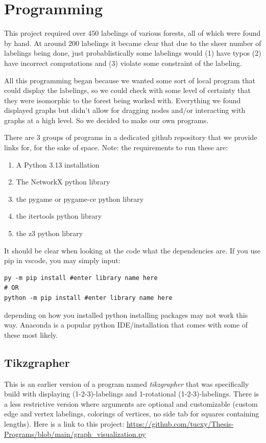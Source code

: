 \chapter{Programming}\label{chap:programming}
This project required over $450$ labelings of various forests, all of which were found by hand. At around $200$ labelings it became clear that due to the sheer number of labelings being done, just probablistically some labelings would (1) have typos (2) have incorrect computations and (3) violate some constraint of the labeling.

All this programming began because we wanted some sort of local program that could display the labelings, so we could check with some level of certainty that they were isomorphic to the forest being worked with. Everything we found displayed graphs but didn't allow for dragging nodes and/or interacting with graphs at a high level. So we decided to make our own programs.

There are $3$ groups of programs in a dedicated github repository that we provide links for, for the sake of space. Note: the requirements to run these are:

\begin{enumerate}
  \item A Python 3.13 installation
  \item The NetworkX python library
  \item the pygame or pygame-ce python library
  \item the itertools python library
  \item the z3 python library
\end{enumerate}
It should be clear when looking at the code what the dependencies are. If you use pip in vscode, you may simply input: 
\begin{verbatim}
py -m pip install #enter library name here
# OR
python -m pip install #enter library name here
\end{verbatim}
depending on how you installed python installing packages may not work this way. Anaconda is a popular python IDE/installation that comes with some of these most likely.

\section{Tikzgrapher}

This is an earlier version of a program named \textit{tikzgrapher} that was specifically build with displaying (1-2-3)-labelings and 1-rotational (1-2-3)-labelings. There is a less restrictive version where arguments are optional and customizable (custom edge and vertex labelings, colorings of vertices, no side tab for squares containing lengths). Here is a link to this project: \url{https://github.com/tucxy/Thesis-Programs/blob/main/graph_visualization.py}

